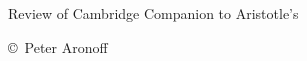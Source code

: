 \begin{titlepage}

\begin{center}

\huge Review of Cambridge Companion to Aristotle's \NE

\vskip2in

\large \copyright\ Peter Aronoff \the\year

\newpage

\end{center}

\end{titlepage}
